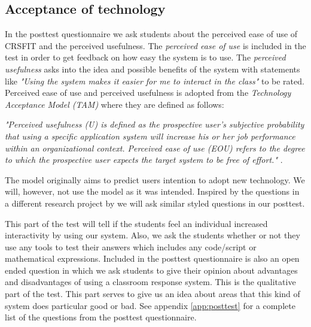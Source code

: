 \subsection{Acceptance of technology}
In the posttest questionnaire we ask students about the perceived ease of use of CRSFIT and the perceived usefulness. The \emph{perceived ease of use} is included in the test in order to get feedback on how easy the system is to use. The \emph{perceived usefulness} asks into the idea and possible benefits of the system with statements like \emph{"Using the system makes it easier for me to interact in the class"} to be rated. Perceived ease of use and perceived usefulness is adopted from the \emph{Technology Acceptance Model (TAM)} \cite{siau2006use,davis1989user} where they are defined as follows:

\emph{"Perceived usefulness (U) is defined as the prospective user's subjective probability that using a specific application system will increase his or her job performance within an organizational context. Perceived ease of use (EOU) refers to the degree to which the prospective user expects the target system to be free of effort."} \cite[p.~985]{davis1989user}.

The model originally aims to predict users intention to adopt new technology. We will, however, not use the model as it was intended. Inspired by the questions in a different research project by  we will ask similar styled questions in our posttest.

This part of the test will tell if the students feel an individual increased interactivity by using our system. Also, we ask the students whether or not they use any tools to test their answers which includes any code/script or mathematical expressions. Included in the posttest questionnaire is also an open ended question in which we ask students to give their opinion about advantages and disadvantages of using a classroom response system. This is the qualitative part of the test. This part serves to give us an idea about areas that this kind of system does particular good or bad. See appendix \ref{app:posttest} for a complete list of the questions from the posttest questionnaire.


